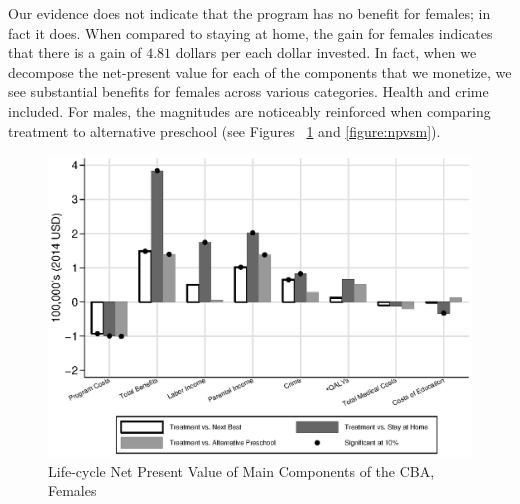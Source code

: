 Our evidence does not indicate that the program has no benefit for females; in fact it does. When compared to staying at home, the gain for females indicates that there is a gain of $4.81$ dollars per each dollar invested. In fact, when we decompose the net-present value for each of the components that we monetize, we see substantial benefits for females across various categories. Health and crime included. For males, the magnitudes are noticeably reinforced when comparing treatment to alternative preschool (see Figures ~\ref{figure:npvsf} and \ref{figure:npvsm}).

\begin{figure}
\caption{Life-cycle Net Present Value of Main Components of the CBA, Females}
\label{figure:npvsf}
\centering
\includegraphics[width=.7\columnwidth]{output/abccare_npvs1.eps}
\floatfoot{
\footnotesize
}
\end{figure}
